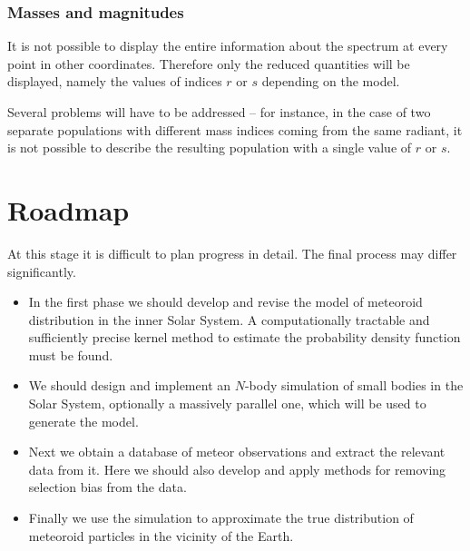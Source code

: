         \subsubsection{Masses and magnitudes} \label{iovm}
            It is not possible to display the entire information about the spectrum at every point
            in other coordinates. Therefore only the reduced quantities will be displayed,
            namely the values of indices $r$ or $s$ depending on the model.

            Several problems will have to be addressed -- for instance, in the case of
            two separate populations with different mass indices coming from the same radiant,
            it is not possible to describe the resulting population with a single value of $r$ or $s$.

\section{Roadmap} \label{ir}
    At this stage it is difficult to plan progress in detail. The final process may differ significantly.

    \begin{itemize}
        \item In the first phase we should develop and revise the model of meteoroid
            distribution in the inner Solar System. A computationally tractable and sufficiently
            precise kernel method to estimate the probability density function must be found.
        \item We should design and implement an $N$-body simulation of small bodies in the Solar System,
            optionally a massively parallel one, which will be used to generate the model.
        \item Next we obtain a database of meteor observations and extract the relevant data from it.
            Here we should also develop and apply methods for removing selection bias from the data.
        \item Finally we use the simulation to approximate the true distribution of meteoroid particles
            in the vicinity of the Earth.
    \end{itemize}


